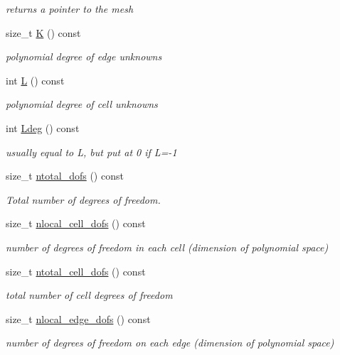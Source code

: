 \begin{DoxyCompactItemize}
\begin{DoxyCompactList}\small\item\em returns a pointer to the mesh \end{DoxyCompactList}\item 
size\+\_\+t \hyperlink{group__HybridCore_gadaf859b98dea34338c9e6376e975b131}{K} () const
\begin{DoxyCompactList}\small\item\em polynomial degree of edge unknowns \end{DoxyCompactList}\item 
int \hyperlink{group__HybridCore_ga816cd87658b200d1ea32d2c4fefd5c6e}{L} () const
\begin{DoxyCompactList}\small\item\em polynomial degree of cell unknowns \end{DoxyCompactList}\item 
int \hyperlink{group__HybridCore_gaaa9fe846646c9e26f699364ac29631f6}{Ldeg} () const
\begin{DoxyCompactList}\small\item\em usually equal to L, but put at 0 if L=-\/1 \end{DoxyCompactList}\item 
size\+\_\+t \hyperlink{group__HybridCore_gaf887b486ad0eea60382e306f1487b44a}{ntotal\+\_\+dofs} () const
\begin{DoxyCompactList}\small\item\em Total number of degrees of freedom. \end{DoxyCompactList}\item 
size\+\_\+t \hyperlink{group__HybridCore_gab698480a3a9e9339d5c191549b817501}{nlocal\+\_\+cell\+\_\+dofs} () const
\begin{DoxyCompactList}\small\item\em number of degrees of freedom in each cell (dimension of polynomial space) \end{DoxyCompactList}\item 
size\+\_\+t \hyperlink{group__HybridCore_ga86e6a3566cf506821606c8802a5f2364}{ntotal\+\_\+cell\+\_\+dofs} () const
\begin{DoxyCompactList}\small\item\em total number of cell degrees of freedom \end{DoxyCompactList}\item 
size\+\_\+t \hyperlink{group__HybridCore_ga41f1294e34e4daade19ad16981eaac15}{nlocal\+\_\+edge\+\_\+dofs} () const
\begin{DoxyCompactList}\small\item\em number of degrees of freedom on each edge (dimension of polynomial space) \end{DoxyCompactList}\item 

\end{DoxyCompactItemize}

